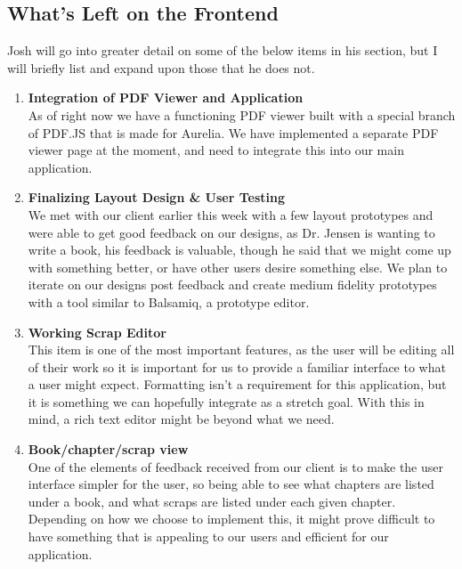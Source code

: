 \documentclass[onecolumn, draftclsnofoot,10pt, compsoc]{IEEEtran}
\begin{document}
\subsection{What's Left on the Frontend}

Josh will go into greater detail on some of the below items in his section, 
but I will briefly list and expand upon those that he does not.

\begin{enumerate}
    \item
    \textbf{Integration of PDF Viewer and Application} \\
	As of right now we have a functioning PDF viewer built with a special branch of PDF.JS that 
	is made for Aurelia. We have implemented a separate PDF viewer page at the moment, and need
	to integrate this into our main application. \\

    \item
    \textbf{Finalizing Layout Design \& User Testing} \\
	We met with our client earlier this week with a few layout prototypes and were able to get
	good feedback on our designs, as Dr. Jensen is wanting to write a book, his feedback is valuable,
	though he said that we might come up with something better, or have other users desire something
	else. We plan to iterate on our designs post feedback and create medium fidelity prototypes with
	a tool similar to Balsamiq, a prototype editor. \\


	\item
	\textbf{Working Scrap Editor} \\
	This item is one of the most important features, as the user will be editing all of their work
	so it is important for us to provide a familiar interface to what a user might expect. Formatting
	isn't a requirement for this application, but it is something we can hopefully integrate as a 
	stretch goal. With this in mind, a rich text editor might be beyond what we need. \\

	\item
	\textbf{Book/chapter/scrap view} \\
	One of the elements of feedback received from our client is to make the user interface
	simpler for the user, so being able to see what chapters are listed under a book, 
	and what scraps are listed under each given chapter. Depending on how we choose to implement 
	this, it might prove difficult to have something that is appealing to our users and efficient
	for our application.\\


\end{enumerate}
\end{document}
